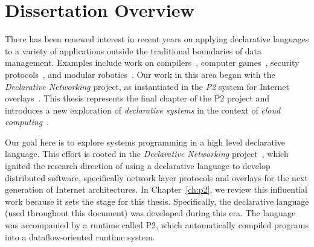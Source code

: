 \chapter[Dissertation Overview]{Dissertation Overview}
\label{ch:overview}

There has been renewed interest in recent years on applying declarative
languages to a variety of applications outside the traditional boundaries of
data management.  Examples include work on compilers~\cite{lam05context},
computer games~\cite{white-sigmod07}, security protocols~\cite{li-padl03}, and
modular robotics~\cite{ashley-iros07}.  Our work in this area began with the
{\em Declarative Networking} project, as instantiated in the {\em P2} system
for Internet overlays~\cite{p2:sosp, loo-sigmod06}.  This thesis represents the
final chapter of the P2 project and introduces a new exploration of {\em
declarative systems} in the context of {\em cloud
computing}~\cite{abovetheclouds}.


Our goal here is to explore systems programming in a high level declarative
language.  This effort is rooted in the {\em Declarative Networking}
project~\cite{boon-thesis}, which ignited the research direction of using a
declarative language to develop distributed software, specifically network
layer protocols and overlays for the next generation of Internet architectures.
In Chapter~\ref{ch:p2}, we review this influential work because it sets the
stage for this thesis.  Specifically, the declarative language \OVERLOG (used
throughout this document) was developed during this era.  The \OVERLOG language
was accompanied by a runtime called P2, which automatically compiled \OVERLOG
programs into a dataflow-oriented runtime system.

